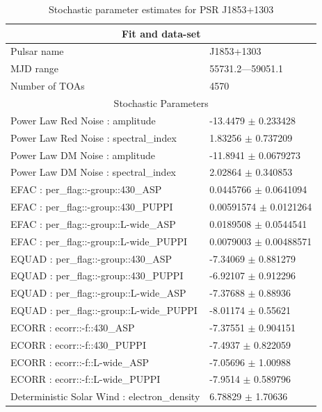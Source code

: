 \documentclass{article}
\begin{document}
\begin{table}
\caption{Stochastic parameter estimates for PSR J1853+1303}
\begin{tabular}{ll}
\hline\hline
\multicolumn{2}{c}{Fit and data-set} \\ 
\hline
Pulsar name\dotfill & J1853+1303 \\ 
MJD range\dotfill & 55731.2---59051.1 \\ 
Number of TOAs\dotfill & 4570 \\
\hline
\multicolumn{2}{c}{Stochastic Parameters} \\ 
\hline
Power Law Red Noise : amplitude \dotfill & -13.4479 $\pm$ 0.233428  \\ 
Power Law Red Noise : spectral_index \dotfill & 1.83256 $\pm$ 0.737209  \\ 
Power Law DM Noise : amplitude \dotfill & -11.8941 $\pm$ 0.0679273  \\ 
Power Law DM Noise : spectral_index \dotfill & 2.02864 $\pm$ 0.340853  \\ 
EFAC : per_flag::-group::430_ASP \dotfill & 0.0445766 $\pm$ 0.0641094  \\ 
EFAC : per_flag::-group::430_PUPPI \dotfill & 0.00591574 $\pm$ 0.0121264  \\ 
EFAC : per_flag::-group::L-wide_ASP \dotfill & 0.0189508 $\pm$ 0.0544541  \\ 
EFAC : per_flag::-group::L-wide_PUPPI \dotfill & 0.0079003 $\pm$ 0.00488571  \\ 
EQUAD : per_flag::-group::430_ASP \dotfill & -7.34069 $\pm$ 0.881279  \\ 
EQUAD : per_flag::-group::430_PUPPI \dotfill & -6.92107 $\pm$ 0.912296  \\ 
EQUAD : per_flag::-group::L-wide_ASP \dotfill & -7.37688 $\pm$ 0.88936  \\ 
EQUAD : per_flag::-group::L-wide_PUPPI \dotfill & -8.01174 $\pm$ 0.55621  \\ 
ECORR : ecorr::-f::430_ASP \dotfill & -7.37551 $\pm$ 0.904151  \\ 
ECORR : ecorr::-f::430_PUPPI \dotfill & -7.4937 $\pm$ 0.822059  \\ 
ECORR : ecorr::-f::L-wide_ASP \dotfill & -7.05696 $\pm$ 1.00988  \\ 
ECORR : ecorr::-f::L-wide_PUPPI \dotfill & -7.9514 $\pm$ 0.589796  \\ 
Deterministic Solar Wind : electron_density \dotfill & 6.78829 $\pm$ 1.70636  \\ 
\hline
\end{tabular}
\label{Table:J1853+1303}
\end{table} 
\end{document}
